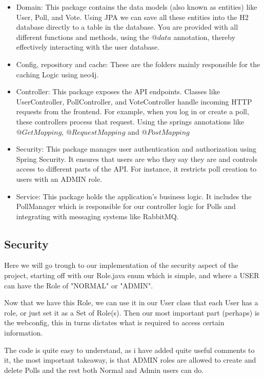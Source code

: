 \begin{itemize}
    \item Domain: This package contains the data models (also known as entities) like User, Poll, and Vote.  Using JPA we can save all these entities into the H2 database directly to a table in the database. You are provided with all different functions and methods, using the $@data$ annotation, thereby effectively interacting with the user database.
    \item Config, repository and cache: These are the folders mainly responsible for the caching Logic using neo4j.
    \item Controller: This package exposes the API endpoints. Classes like UserController, PollController, and VoteController handle incoming HTTP requests from the frontend. For example, when you log in or create a poll, these controllers process that request. Using the springs annotations like $@GetMapping$, $@RequestMapping$ and $@PostMapping$
    \item Security: This package manages user authentication and authorization using Spring Security. It ensures that users are who they say they are and controls access to different parts of the API. For instance, it restricts poll creation to users with an ADMIN role.
    \item Service: This package holds the application's business logic. It includes the PollManager which is responsible for our controller logic for Polls and integrating with messaging systems like RabbitMQ.
\end{itemize}



\subsection{Security}

Here we will go trough to our implementation of the security aspect of the project, starting off with our Role.java enum which is simple, and where a USER can have the Role of "NORMAL" or "ADMIN".

Now that we have this Role, we can use it in our User class that each User has a role, or just set it as a Set of Role(s).
Then our most important part (perhaps) is the webconfig, this in turns dictates what is required to access certain information.

The code is quite easy to understand, as i have added quite useful comments to it, the most important takeaway, is that ADMIN roles are allowed to create and delete Polls and the rest both Normal and Admin users can do. 

